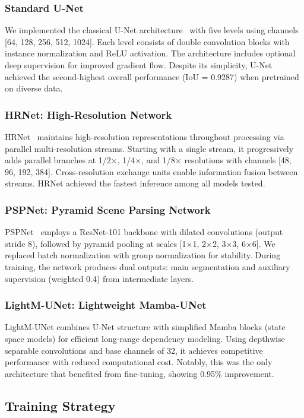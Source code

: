 \documentclass[preprint,12pt]{elsarticle}
\begin{document}
\subsubsection{Standard U-Net}
We implemented the classical U-Net architecture~\cite{unet} with five levels using channels [64, 128, 256, 512, 1024]. Each level consists of double convolution blocks with instance normalization and ReLU activation. The architecture includes optional deep supervision for improved gradient flow. Despite its simplicity, U-Net achieved the second-highest overall performance (IoU = 0.9287) when pretrained on diverse data.

\subsubsection{HRNet: High-Resolution Network}
HRNet~\cite{sun2019deep} maintains high-resolution representations throughout processing via parallel multi-resolution streams. Starting with a single stream, it progressively adds parallel branches at 1/2×, 1/4×, and 1/8× resolutions with channels [48, 96, 192, 384]. Cross-resolution exchange units enable information fusion between streams. HRNet achieved the fastest inference among all models tested.

\subsubsection{PSPNet: Pyramid Scene Parsing Network}
PSPNet~\cite{zhao2017pyramid} employs a ResNet-101 backbone with dilated convolutions (output stride 8), followed by pyramid pooling at scales [1×1, 2×2, 3×3, 6×6]. We replaced batch normalization with group normalization for stability. During training, the network produces dual outputs: main segmentation and auxiliary supervision (weighted 0.4) from intermediate layers.

\subsubsection{LightM-UNet: Lightweight Mamba-UNet}
LightM-UNet combines U-Net structure with simplified Mamba blocks (state space models) for efficient long-range dependency modeling. Using depthwise separable convolutions and base channels of 32, it achieves competitive performance with reduced computational cost. Notably, this was the only architecture that benefited from fine-tuning, showing 0.95\% improvement.

\subsection{Training Strategy}
\label{subsec:training}
\end{document}
